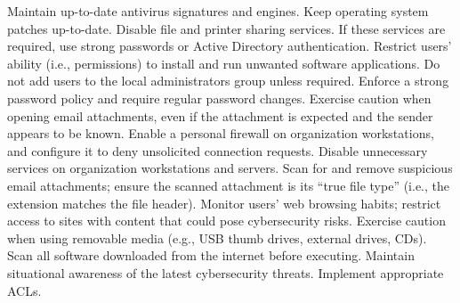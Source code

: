 \documentclass[10pt,a4paper, titlepage]{report}
\begin{document}
Maintain up-to-date antivirus signatures and engines.
Keep operating system patches up-to-date.
Disable file and printer sharing services. If these services are required, use strong passwords or Active Directory authentication.
Restrict users’ ability (i.e., permissions) to install and run unwanted software applications. Do not add users to the local administrators group unless required.
Enforce a strong password policy and require regular password changes.
Exercise caution when opening email attachments, even if the attachment is expected and the sender appears to be known.
Enable a personal firewall on organization workstations, and configure it to deny unsolicited connection requests.
Disable unnecessary services on organization workstations and servers.
Scan for and remove suspicious email attachments; ensure the scanned attachment is its “true file type” (i.e., the extension matches the file header).
Monitor users’ web browsing habits; restrict access to sites with content that could pose cybersecurity risks.
Exercise caution when using removable media (e.g., USB thumb drives, external drives, CDs).
Scan all software downloaded from the internet before executing.
Maintain situational awareness of the latest cybersecurity threats.
Implement appropriate ACLs.



\listoffigures
\listoftables
\lstlistoflistings
\end{document}
